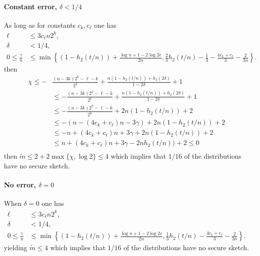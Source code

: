\paragraph{Constant error, $\delta<1/4$} 
As long as for constants $c_k, c_\ell$ one has
\begin{align*}
\ell&\le 3c_\ell n2^k,\\
\delta &< 1/4,\\
0\le\frac{\gamma}{n} &\le \min\left\{(1-h_2(t/n)) +\frac{\log{n}+1-2\log{2e}}{2n}, \frac{2}{3}h_2(t/n)-\frac{1}{3}-\frac{4c_k+c_\ell}{3}-\frac{2}{3n}\right\}.
\end{align*} then 
\begin{align*}
\chi\le-&\frac{(n-3k)2^k-\ell-k}{2^k} + \frac{n(1-h_2(t/n)) +h_2(2\delta)}{1-2\delta}+1\\
&\le -\frac{(n-3k)2^k-\ell-k}{2^k} + \frac{n(1-h_2(t/n)) +h_2(2\delta)}{1-2\delta}+1 \\
&\le -\frac{(n-3k)2^k-\ell-k}{2^k} + 2n(1-h_2(t/n)) +2\\
 &\le -(n-(4c_k+c_\ell)n - 3\gamma) + 2n(1-h_2(t/n)) +2\\
&\le -n+(4c_k+c_\ell)n+3\gamma + 2n(1-h_2(t/n))+2 \\\
&\le n+(4c_k+c_\ell)n+3\gamma -2nh_2(t/n))+2 \le 0\\
\end{align*}
then $\tilde{m} \le 2+2\max\{\chi, \log{2}\} \le 4$ which implies that $1/16$ of the distributions have no secure sketch.

\paragraph{No error, $\delta=0$}
When $\delta = 0$ one has
\begin{align*}
\ell&\le 3c_\ell n2^k,\\
\delta &< 1/4,\\
0\le\frac{\gamma}{n} &\le \min\left\{(1-h_2(t/n)) +\frac{\log{n}+1-2\log{2e}}{2n}, \frac{1}{3}h_2(t/n)-\frac{4c_k+c_\ell}{3}-\frac{2}{3n}\right\}.
\end{align*} 
yielding $\tilde{m}\le 4$ which implies that $1/16$ of the distributions have no secure sketch.




